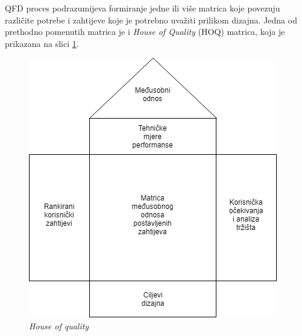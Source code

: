 \documentclass[12pt]{article}
\begin{document}
\newpage

QFD proces podrazumijeva formiranje jedne ili vi\v{s}e matrica koje povezuju razli\v{c}ite potrebe i zahtijeve koje je potrebno uva\v{z}iti prilikom dizajna. Jedna od prethodno pomenutih matrica je i \textit{House of Quality} (HOQ) matrica, koja je prikazana na slici \ref{hoq}.  

\begin{figure}[!h]
\centering
\includegraphics[scale=0.8]{hoq}
\caption{\textit{House of quality}}
\label{hoq}
\end{figure}
 
\end{document}
